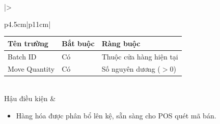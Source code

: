 \documentclass[12pt,a4paper]{report}
\begin{document}
\begin{longtable}{|>{\raggedright\arraybackslash\bfseries}p{4.5cm}|p{11cm}|}
\vspace{0.1cm}
\begin{tabular}{|p{3.5cm}|p{2.5cm}|p{4cm}|}
\hline
\textbf{Tên trường} & \textbf{Bắt buộc} & \textbf{Ràng buộc} \\ \hline
Batch ID & Có & Thuộc cửa hàng hiện tại \\ \hline
Move Quantity & Có & Số nguyên dương ($>0$) \\ \hline
\end{tabular} \\ \hline
Hậu điều kiện & 
\begin{itemize}[leftmargin=*, nosep, topsep=0pt, partopsep=0pt]
    \item Hàng hóa được phân bổ lên kệ, sẵn sàng cho POS quét mã bán.
\end{itemize} \\ \hline
\end{longtable}

\vspace{0.5cm}
\end{document}
